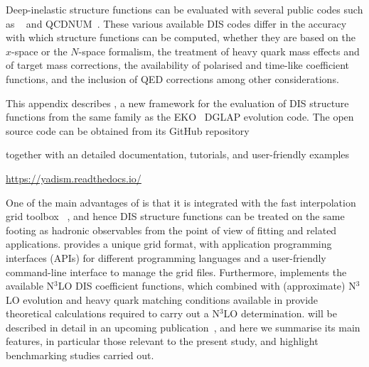 
Deep-inelastic structure functions can be evaluated with several public codes
such as \apfel~\cite{Bertone:2013vaa} and \textsc{\small
QCDNUM}~\cite{Botje:2010ay}.
%
These various available DIS codes differ in the accuracy with which structure
functions can be computed, whether they are based on the $x$-space or the
$N$-space formalism, the treatment of heavy quark mass effects and of target
mass corrections, the availability of polarised and time-like coefficient
functions, and the inclusion of QED corrections among  other considerations.

This appendix describes \yadism, a new framework for the evaluation of DIS
structure functions from the same family as the \textsc{\small
EKO}~\cite{Candido:2022tld} DGLAP evolution code.
%
The open source \yadism code can be obtained from its GitHub repository
\begin{center}
\end{center}  
together with an detailed documentation, tutorials, and user-friendly examples
\begin{center}
  \url{https://yadism.readthedocs.io/}
\end{center}  
One of the main advantages of \yadism is that it is integrated with the fast
interpolation grid toolbox \pineappl~\cite{Carrazza:2020gss},
and hence DIS structure functions can be treated on the same footing as
hadronic observables from the point of view of \pdf{} fitting and related
applications.
%
\pineappl provides a unique grid format, with application
programming interfaces (APIs) for different programming languages and a
user-friendly command-line interface to manage the grid files.
%
Furthermore, \yadism implements the available N$^3$LO DIS coefficient
functions, which combined with (approximate)  N$^3$LO evolution and heavy quark
matching conditions available in \eko provide theoretical
calculations required to carry out a N$^3$LO \pdf{} determination.
%
\yadism will be described in detail in an upcoming publication~\cite{yadism},
and here we summarise its main features, in particular those relevant to the
present study, and highlight benchmarking studies carried out.

